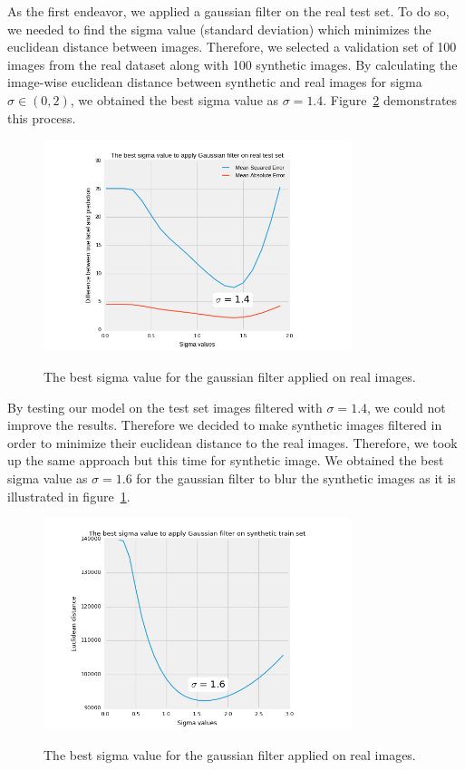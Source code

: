 As the first endeavor, we applied a gaussian filter on the real test set. To do so, we needed to find the sigma value (standard deviation) which minimizes the euclidean distance between images. Therefore, we selected a validation set of 100 images from the real dataset along with 100 synthetic images. By calculating the image-wise euclidean distance between synthetic and real images for sigma $ \sigma \in (0, 2) $, we obtained the best sigma value as $ \sigma = 1.4 $. Figure~\ref{sigsig} demonstrates this process. 
\begin{figure}[H]
	\centering
	{\includegraphics[width=0.8\textwidth]{images/sigmaTest}}
	\caption{The best sigma value for the gaussian filter applied on real images.}
	\label{sig2}
\end{figure}
By testing our model on the test set images filtered with $ \sigma=1.4 $, we could not improve the results. Therefore we decided to make synthetic images filtered in order to minimize their euclidean distance to the real images. Therefore, we took up the same approach but this time for synthetic image. We obtained the best sigma value as $ \sigma=1.6 $ for the gaussian filter to blur the synthetic images as it is illustrated in figure~\ref{sig2}.   
\begin{figure}[H]
	\centering
	{\includegraphics[width=0.8\textwidth]{images/sigmaTrain}}
	\caption{The best sigma value for the gaussian filter applied on real images.}
	\label{sigsig}
\end{figure}
